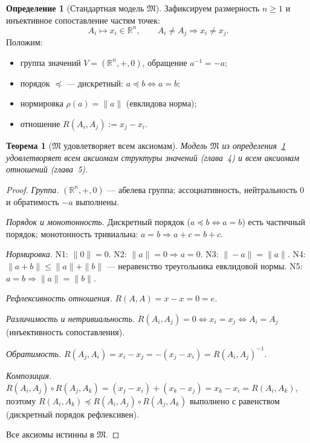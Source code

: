 \documentclass[12pt,a4paper,oneside]{book}
\theoremstyle{definition}
\newtheorem{definition}{Определение}[chapter]
\theoremstyle{plain}
\newtheorem{theorem}{Теорема}[chapter]
\theoremstyle{remark}
\newcommand{\Rel}{R}
\newcommand{\Values}{V}
\newcommand{\comp}{\circ}
\newcommand{\Vord}{\preceq}
\newcommand{\norm}{\rho}
\newcommand{\ide}{e}
\begin{document}
\begin{definition}[Стандартная модель $\mathfrak M$]\label{def:model}
Зафиксируем размерность $n\ge1$ и инъективное сопоставление частям точек:
\[
A_i\longmapsto x_i\in\mathbb R^n,\qquad A_i\neq A_j\Rightarrow x_i\neq x_j.
\]
Положим:
\begin{itemize}
    \item группа значений $\Values=(\mathbb R^n,+,0)$, обращение $a^{-1}=-a$;
    \item порядок $\Vord$ --- дискретный: $a\Vord b\iff a=b$;
    \item нормировка $\norm(a)=\|a\|$ (евклидова норма);
    \item отношение $\Rel(A_i,A_j):=x_j-x_i$.
\end{itemize}
\end{definition}

\begin{theorem}[$\mathfrak M$ удовлетворяет всем аксиомам]\label{thm:consistency}
Модель $\mathfrak M$ из определения~\ref{def:model} удовлетворяет всем аксиомам
структуры значений (глава~4) и всем аксиомам отношений (глава~5).
\end{theorem}

\begin{proof}
\emph{Группа.} $(\mathbb R^n,+,0)$ --- абелева группа; ассоциативность,
нейтральность $0$ и обратимость $-a$ выполнены.

\emph{Порядок и монотонность.} Дискретный порядок ($a\Vord b\iff a=b$) есть частичный
порядок; монотонность тривиальна: $a=b\Rightarrow a+c=b+c$.

\emph{Нормировка.} N1: $\|0\|=0$. N2: $\|a\|=0\Rightarrow a=0$. N3:
$\|-a\|=\|a\|$. N4: $\|a+b\|\le\|a\|+\|b\|$ --- неравенство треугольника евклидовой
нормы. N5: $a=b\Rightarrow\|a\|=\|b\|$.

\emph{Рефлексивность отношения.} $\Rel(A,A)=x-x=0=\ide$.

\emph{Различимость и нетривиальность.} $\Rel(A_i,A_j)=0\iff x_i=x_j\iff A_i=A_j$
(инъективность сопоставления).

\emph{Обратимость.} $\Rel(A_j,A_i)=x_i-x_j=-(x_j-x_i)=\Rel(A_i,A_j)^{-1}$.

\emph{Композиция.} $\Rel(A_i,A_j)\comp\Rel(A_j,A_k)=(x_j-x_i)+(x_k-x_j)=x_k-x_i
=\Rel(A_i,A_k)$, поэтому $\Rel(A_i,A_k)\Vord\Rel(A_i,A_j)\comp\Rel(A_j,A_k)$ выполнено
с равенством (дискретный порядок рефлексивен).

Все аксиомы истинны в $\mathfrak M$.
\end{proof}
\end{document}
